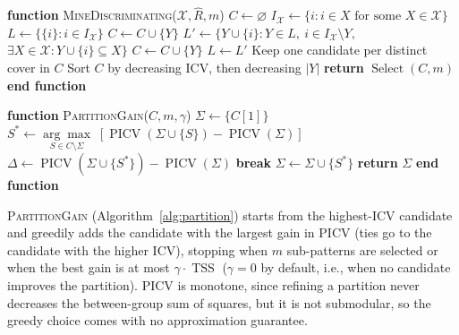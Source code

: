 \documentclass[sigconf]{acmart}
\newcommand{\ICV}{\operatorname{ICV}}
\newcommand{\PICV}{\operatorname{PICV}}
\newcommand{\TSS}{\operatorname{TSS}}
\begin{document}
\begin{algorithm}[tb]
\caption{Extracting multiple discriminating sub-patterns}\label{alg:extract}
\footnotesize
\begin{algorithmic}[1]
\STATE \textbf{function} \textsc{MineDiscriminating}($\mathcal X,\hat R,m$)
 \STATE $C\gets\varnothing$
 \STATE $I_{\mathcal X}\gets\{i:i\in X\text{ for some }X\in\mathcal X\}$
 \STATE $L\gets\{\{i\}:i\in I_{\mathcal X}\}$
  \IF{$\ICV(Y,\hat R)>0$} \STATE $C\gets C\cup\{Y\}$ \ENDIF
 \ENDFOR
  \STATE $L'\gets\{Y\cup\{i\}:Y\in L,\ i\in I_{\mathcal X}\setminus Y,$
  \STATE \hspace{2.35em}$\exists X\in\mathcal X:Y\cup\{i\}\subseteq X\}$
   \IF{$\ICV(Y,\hat R)>0$} \STATE $C\gets C\cup\{Y\}$ \ENDIF
  \ENDFOR
  \STATE $L\gets L'$
 \ENDWHILE
 \STATE Keep one candidate per distinct cover in $C$
 \STATE Sort $C$ by decreasing ICV, then decreasing $|Y|$
 \STATE \textbf{return} $\operatorname{Select}(C,m)$
\STATE \textbf{end function}
\end{algorithmic}
\end{algorithm}

\begin{algorithm}[tb]
\caption{Selecting complementary sub-patterns by partition gain}\label{alg:partition}
\footnotesize
\begin{algorithmic}[1]
\STATE \textbf{function} \textsc{PartitionGain}($C,m,\gamma$)
 \STATE $\Sigma\gets\{C[1]\}$ 
  \STATE $S^*\gets\underset{S\in C\setminus\Sigma}{\arg\max}\;[\PICV(\Sigma\cup\{S\})-\PICV(\Sigma)]$
  \STATE $\Delta\gets\PICV(\Sigma\cup\{S^*\})-\PICV(\Sigma)$
  \IF{$\Delta\leq\gamma\cdot\TSS$} \STATE \textbf{break} \ENDIF
  \STATE $\Sigma\gets\Sigma\cup\{S^*\}$
 \ENDWHILE
 \STATE \textbf{return} $\Sigma$
\STATE \textbf{end function}
\end{algorithmic}
\end{algorithm}

\textsc{PartitionGain} (Algorithm~\ref{alg:partition}) starts from the highest-ICV candidate and greedily adds the candidate with the largest gain in PICV (ties go to the candidate with the higher ICV), stopping when $m$ sub-patterns are selected or when the best gain is at most $\gamma\cdot\TSS$ ($\gamma=0$ by default, i.e., when no candidate improves the partition). PICV is monotone, since refining a partition never decreases the between-group sum of squares, but it is not submodular, so the greedy choice comes with no approximation guarantee.
\end{document}
